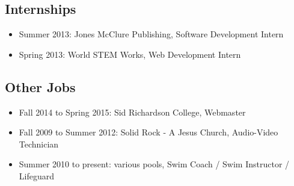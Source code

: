 \documentclass[12pt]{article}
\begin{document}
\subsection{Internships}

\begin{itemize}
    \item{Summer 2013: Jones McClure Publishing, Software Development Intern}
    \item{Spring 2013: World STEM Works, Web Development Intern}
\end{itemize}





\subsection{Other Jobs}

\begin{itemize}
    \item{Fall 2014 to Spring 2015: Sid Richardson College, Webmaster}
    \item{Fall 2009 to Summer 2012: Solid Rock - A Jesus Church, Audio-Video Technician}
    \item{Summer 2010 to present: various pools, Swim Coach / Swim Instructor / Lifeguard}
\end{itemize}
\end{document}
